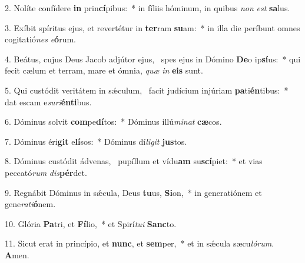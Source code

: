 2. Nolíte confídere \textbf{in} prin\textbf{cí}pibus:~*  in fíliis hóminum, in quibus \textit{non} \textit{est} \textbf{sa}lus.\

3. Exíbit spíritus ejus, et revertétur in \textbf{ter}ram \textbf{su}am:~*  in illa die períbunt omnes cogitatió\textit{nes} \textit{e}\textbf{ó}rum.\

4. Beátus, cujus Deus Jacob adjútor ejus, \dag\  spes ejus in Dómino \textbf{De}o ip\textbf{sí}us:~*  qui fecit cælum et terram, mare et ómnia, \textit{quæ} \textit{in} \textbf{e}\textbf{is} sunt.\

5. Qui custódit veritátem in sǽculum, \dag\  facit judícium injúriam \textbf{pa}ti\textbf{én}tibus:~*  dat escam e\textit{su}\textit{ri}\textbf{én}\textbf{ti}bus.\

6. Dóminus solvit \textbf{com}pe\textbf{dí}tos:~*  Dóminus illú\textit{mi}\textit{nat} \textbf{cæ}cos.\

7. Dóminus éri\textbf{git} e\textbf{lí}sos:~*  Dóminus dí\textit{li}\textit{git} \textbf{jus}tos.\

8. Dóminus custódit ádvenas, \dag\  pupíllum et vídu\textbf{am} su\textbf{scí}piet:~*  et vias peccató\textit{rum} \textit{dis}\textbf{pér}det.\

9. Regnábit Dóminus in sǽcula, Deus \textbf{tu}us, \textbf{Si}on,~*  in generatiónem et gene\textit{ra}\textit{ti}\textbf{ó}nem.\

10. Glória \textbf{Pa}tri, et \textbf{Fí}lio,~*  et Spirí\textit{tu}\textit{i} \textbf{Sanc}to.\

11. Sicut erat in princípio, et \textbf{nunc}, et \textbf{sem}per,~*  et in sǽcula sæcu\textit{ló}\textit{rum}. \textbf{A}men.\

